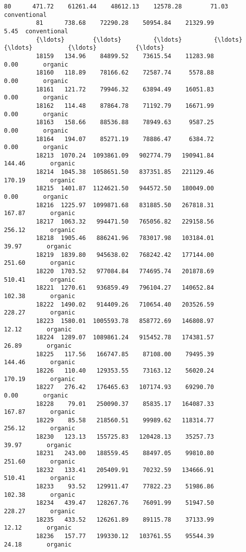 \documentclass[11pt]{article}
\begin{document}
\begin{Verbatim}[commandchars=\\\{\}]
         80      471.72    61261.44    48612.13    12578.28        71.03  conventional   
         81      738.68    72290.28    50954.84    21329.99         5.45  conventional   
         {\ldots}        {\ldots}         {\ldots}         {\ldots}         {\ldots}          {\ldots}           {\ldots}   
         18159   134.96    84899.52    73615.54    11283.98         0.00       organic   
         18160   118.89    78166.62    72587.74     5578.88         0.00       organic   
         18161   121.72    79946.32    63894.49    16051.83         0.00       organic   
         18162   114.48    87864.78    71192.79    16671.99         0.00       organic   
         18163   158.66    88536.88    78949.63     9587.25         0.00       organic   
         18164   194.07    85271.19    78886.47     6384.72         0.00       organic   
         18213  1070.24  1093861.09   902774.79   190941.84       144.46       organic   
         18214  1045.38  1058651.50   837351.85   221129.46       170.19       organic   
         18215  1401.87  1124621.50   944572.50   180049.00         0.00       organic   
         18216  1225.97  1099871.68   831885.50   267818.31       167.87       organic   
         18217  1063.32   994471.50   765056.82   229158.56       256.12       organic   
         18218  1905.46   886241.96   783017.98   103184.01        39.97       organic   
         18219  1839.80   945638.02   768242.42   177144.00       251.60       organic   
         18220  1703.52   977084.84   774695.74   201878.69       510.41       organic   
         18221  1270.61   936859.49   796104.27   140652.84       102.38       organic   
         18222  1490.02   914409.26   710654.40   203526.59       228.27       organic   
         18223  1580.01  1005593.78   858772.69   146808.97        12.12       organic   
         18224  1289.07  1089861.24   915452.78   174381.57        26.89       organic   
         18225   117.56   166747.85    87108.00    79495.39       144.46       organic   
         18226   110.40   129353.55    73163.12    56020.24       170.19       organic   
         18227   276.42   176465.63   107174.93    69290.70         0.00       organic   
         18228    79.01   250090.37    85835.17   164087.33       167.87       organic   
         18229    85.58   218560.51    99989.62   118314.77       256.12       organic   
         18230   123.13   155725.83   120428.13    35257.73        39.97       organic   
         18231   243.00   188559.45    88497.05    99810.80       251.60       organic   
         18232   133.41   205409.91    70232.59   134666.91       510.41       organic   
         18233    93.52   129911.47    77822.23    51986.86       102.38       organic   
         18234   439.47   128267.76    76091.99    51947.50       228.27       organic   
         18235   433.52   126261.89    89115.78    37133.99        12.12       organic   
         18236   157.77   199330.12   103761.55    95544.39        24.18       organic   
         

\end{Verbatim}
\end{document}
